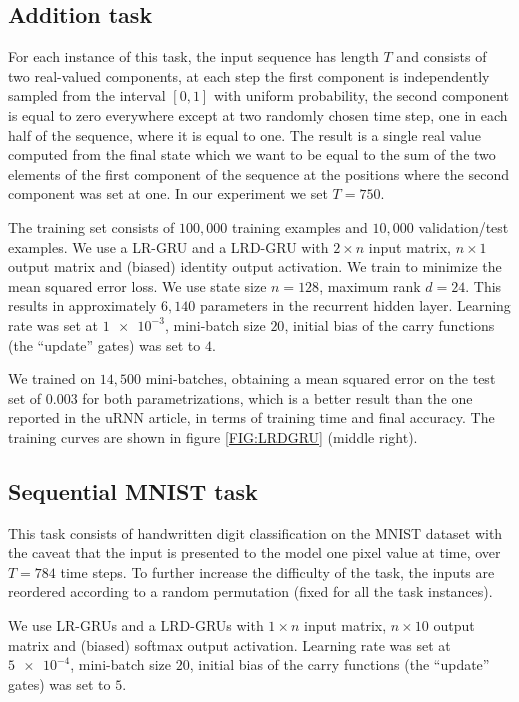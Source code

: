 \documentclass[11pt,a4paper]{article}
\begin{document}
\subsection{Addition task}
For each instance of this task, the input sequence has length $T$ and consists of two real-valued components, at each step the first component is independently sampled from the interval $[0, 1]$ with uniform probability, the second component is equal to zero everywhere except at two randomly chosen time step, one in each half of the sequence, where it is equal to one. The result is a single real value computed from the final state which we want to be equal to the sum of the two elements of the first component of the sequence at the positions where the second component was set at one. In our experiment we set $T=750$.

The training set consists of $100,000$ training examples and $10,000$ validation/test examples. We use a LR-GRU and a LRD-GRU with $2 \times n$ input matrix, $n \times 1$ output matrix and (biased) identity output activation. We train to minimize the mean squared error loss. We use state size $n=128$, maximum rank $d=24$.
This results in approximately $6,140$ parameters in the recurrent hidden layer. Learning rate was set at $\num{1e-3}$, mini-batch size $20$, initial bias of the carry functions (the ``update'' gates) was set to $4$.

We trained on $14,500$ mini-batches, obtaining a mean squared error on the test set of $0.003$ for both parametrizations, which is a better result than the one reported in the uRNN article, in terms of training time and final accuracy.
The training curves are shown in figure \ref{FIG:LRDGRU} (middle right).

\subsection{Sequential MNIST task}

This task consists of handwritten digit classification on the MNIST dataset with the caveat that the input is presented to the model one pixel value at time, over $T=784$ time steps. To further increase the difficulty of the task, the inputs are reordered according to a random permutation (fixed for all the task instances).

We use LR-GRUs and a LRD-GRUs with $1 \times n$ input matrix, $n \times 10$ output matrix and (biased) softmax output activation. Learning rate was set at $\num{5e-4}$, mini-batch size $20$, initial bias of the carry functions (the ``update'' gates) was set to $5$. 
\end{document}
